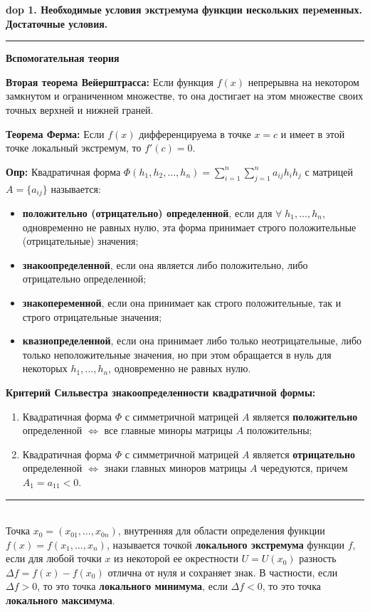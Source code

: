 \textbf{\LARGE dop 1. Необходимые условия экстpемума функции нескольких пеpеменных. Достаточные условия.}

\rule{275pt}{0.5pt}
\begin{center}
    \textbf{Вспомогательная теория}
\end{center}

\textbf{Вторая теорема Вейерштрасса:} Если функция $f(x)$ непрерывна на некотором замкнутом и ограниченном множестве, то она достигает на этом множестве своих точных верхней и нижней граней.

\textbf{Теорема Ферма:} Если $f(x)$ дифференцируема в точке $x=c$ и имеет в этой точке локальный экстремум, то $f'(c) = 0$.  

\textbf{Опр:} Квадратичная форма $\Phi(h_1, h_2, \ldots, h_n) = \sum_{i=1}^n \sum_{j=1}^n a_{ij} h_i h_j$ с матрицей $A = \{a_{ij}\}$ называется:
\begin{itemize}
    \item \textbf{положительно (отрицательно) определенной}, если для $\forall \; h_1, \ldots, h_n$, одновременно не равных нулю, эта форма принимает строго положительные (отрицательные) значения;
    \item \textbf{знакоопределенной}, если она является либо положительно, либо отрицательно определенной;
    \item \textbf{знакопеременной}, если она принимает как строго положительные, так и строго отрицательные значения;
    \item \textbf{квазиопределенной}, если она принимает либо только неотрицательные, либо только неположительные значения, но при этом обращается в нуль для некоторых $h_1, \ldots, h_n$, одновременно не равных нулю.
\end{itemize}

\textbf{Критерий Сильвестра знакоопределенности квадратичной формы:}
\begin{enumerate}
    \item Квадратичная форма $\Phi$ с симметричной матрицей $A$ является \textbf{положительно} определенной $\Leftrightarrow$ все главные миноры матрицы $A$ положительны;
    \item Квадратичная форма $\Phi$ с симметричной матрицей $A$ является \textbf{отрицательно} определенной $\Leftrightarrow$ знаки главных миноров матрицы $A$ чередуются, причем $A_1 = a_{11} < 0$.
\end{enumerate}
\rule{275pt}{0.5pt} \\

 Точка $x_0 = (x_{01}, \ldots, x_{0n})$, внутренняя для области определения функции $f(x) = f(x_1, \ldots, x_n)$, называется точкой \textbf{локального экстремума} функции $f$, если для любой точки $x$ из некоторой ее окрестности $U = U(x_0)$ разность $\Delta f = f(x) - f(x_0)$ отлична от нуля и сохраняет знак. В частности, если $\Delta f> 0$, то это точка \textbf{локального минимума}, если $\Delta f < 0$, то это точка \textbf{локального максимума}.\\

